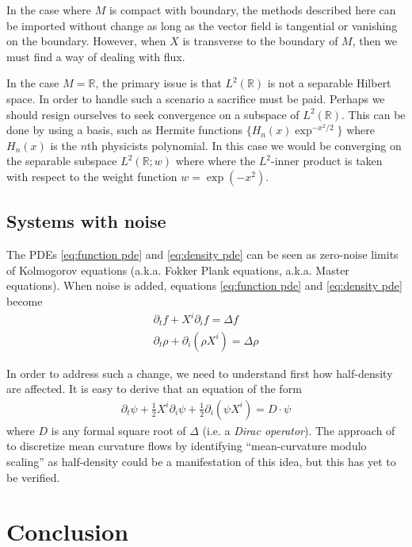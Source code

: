 \documentclass[12pt]{amsart}
\begin{document}
In the case where $M$ is compact with boundary, the methods described here can be imported without change as long as the vector field is tangential or vanishing on the boundary.
However, when $X$ is transverse to the boundary of $M$, then we must find a way of dealing with flux.

In the case $M = \mathbb{R}$, the primary issue is that $L^{2}(\mathbb{R})$ is not a separable Hilbert space.
In order to handle such a scenario a sacrifice must be paid.  Perhaps we should resign ourselves to seek convergence on a subspace of $L^{2}(\mathbb{R})$.
This can be done by using a basis, such as Hermite functions $\{ H_{n}(x) \exp^{-x^{2}/2}\}$ where $H_{n}(x)$ is the $n$th physicists polynomial.
In this case we would be converging on the separable subspace $L^{2}( \mathbb{R};  w)$ where where the $L^{2}$-inner product is taken with respect to the weight function $w = \exp( -x^{2})$.

\subsection{Systems with noise}
The PDEs \eqref{eq:function pde} and \eqref{eq:density pde} can be seen as zero-noise limits of Kolmogorov equations (a.k.a. Fokker Plank equations, a.k.a. Master equations).
When noise is added, equations \eqref{eq:function pde} and \eqref{eq:density pde} become
\begin{align*}
	\partial_{t} f + X^{i} \partial_{i} f = \Delta f \\
	\partial_{t} \rho + \partial_{i} ( \rho X^{i}) = \Delta \rho
\end{align*}

In order to address such a change, we need to understand first how half-density are affected.
It is easy to derive that an equation of the form
\begin{align*}
	\partial_{t} \psi + \frac{1}{2} X^{i} \partial_{i} \psi + \frac{1}{2} \partial_{i}( \psi X^{i} ) = D \cdot \psi
\end{align*}
where $D$ is any formal square root of $\Delta$ (i.e. a \emph{Dirac operator}).
The approach of \cite{Crane2013} to discretize mean curvature flows by identifying ``mean-curvature modulo scaling'' as half-density could be a manifestation of this idea, but this has yet to be verified.


\section{Conclusion}
\end{document}
